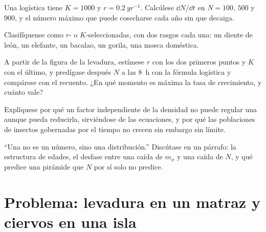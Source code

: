 \begin{exercise}[$\star\star$]\label{exo:b1:populations:8}
Una  logística tiene $K = 1000$ y $r = \qty{0.2}{yr^{-1}}$.
Calcúlese $\dd N/\dd t$ en $N = 100$, $500$ y $900$, y el número máximo que
puede cosecharse cada año sin que decaiga.
\end{exercise}

\begin{exercise}[$\star\star$]\label{exo:b1:populations:9}
Clasifíquense como $r$- o $K$-seleccionadas, con dos rasgos cada una: un
diente de león, un elefante, un bacalao, un gorila, una mosca doméstica.
\end{exercise}

\begin{exercise}[$\star\star\star$]\label{exo:b1:populations:10}
A partir de la figura de la levadura, estímese $r$ con los dos primeros
puntos y $K$ con el último, y predígase después $N$ a las \qty{8}{h} con la
fórmula logística y compárese con el recuento. ¿En qué momento es máxima la
tasa de crecimiento, y cuánto vale?
\end{exercise}

\begin{exercise}[$\star\star\star$]\label{exo:b1:populations:11}
Explíquese por qué un factor independiente de la densidad no puede regular
una  aunque pueda reducirla, sirviéndose de las ecuaciones, y por
qué las poblaciones de insectos gobernadas por el tiempo no crecen sin
embargo sin límite.
\end{exercise}

\begin{exercise}[$\star\star\star$]\label{exo:b1:populations:12}
``Una  no es un número, sino una distribución.'' Discútase en un
párrafo: la estructura de edades, el desfase entre una caída de $m_x$ y una
caída de $N$, y qué predice una pirámide que $N$ por sí solo no predice.
\end{exercise}

\section{Problema: levadura en un matraz y ciervos en una isla}

